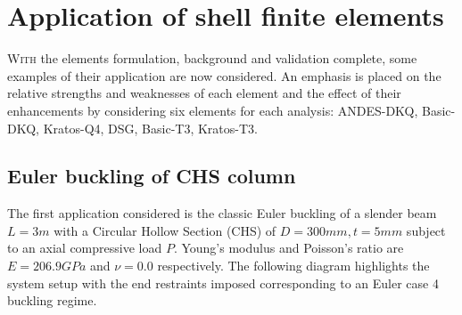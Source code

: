 



\chapter{Application of shell finite elements}
\label{chap:chapter_application}

\renewcommand{\Thema}{Application of shell finite elements}

\lettrine[lines=2]{W}{ith} the elements formulation, background and validation complete, some examples of their application are now considered. An emphasis is placed on the relative strengths and weaknesses of each element and the effect of their enhancements by considering six elements for each analysis: ANDES-DKQ, Basic-DKQ, Kratos-Q4, DSG, Basic-T3, Kratos-T3.

\section{Euler buckling of CHS column}
\label{applications: Euler buckling of CHS column}
The first application considered is the classic Euler buckling of a slender beam $L=3m$ with a Circular Hollow Section (CHS) of $D = 300mm, t = 5mm$ subject to an axial compressive load $P$. Young's modulus and Poisson's ratio are $E = 206.9GPa$ and $\nu = 0.0$ respectively. The following diagram highlights the system setup with the end restraints imposed corresponding to an Euler case 4 buckling regime. 

